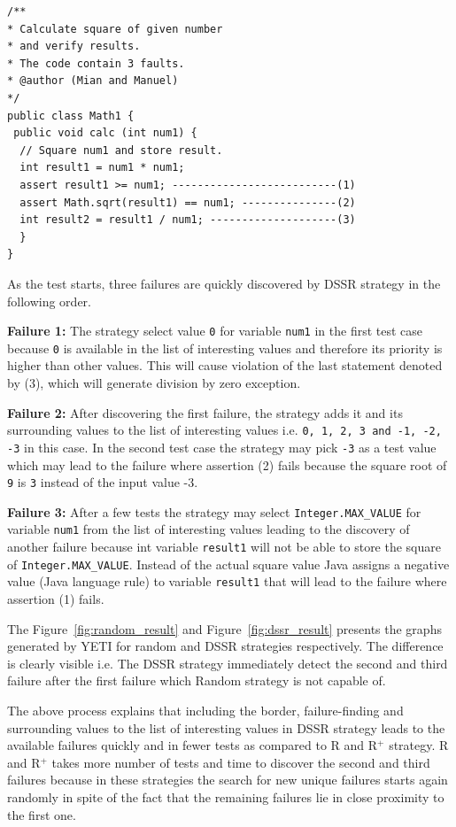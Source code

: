 \bigskip
\begin{lstlisting}
/** 
* Calculate square of given number 
* and verify results. 
* The code contain 3 faults.
* @author (Mian and Manuel)
*/
public class Math1 {
 public void calc (int num1) {
  // Square num1 and store result. 
  int result1 = num1 * num1; 
  assert result1 >= num1; --------------------------(1)
  assert Math.sqrt(result1) == num1; ---------------(2)
  int result2 = result1 / num1; --------------------(3)
  } 
}
\end{lstlisting}

As the test starts, three failures are quickly discovered by DSSR strategy in the following order.

\indent \textbf{Failure 1:} The strategy select value \verb+0+ for variable \verb+num1+  in the first test case because \verb+0+ is available in the list of interesting values and therefore its priority is higher than other values. This will cause violation of the last statement denoted by (3), which will generate division by zero exception.

\indent \textbf{Failure 2:} After discovering the first failure, the strategy adds it and its surrounding values to the list of interesting values i.e. \verb+0, 1, 2, 3 and -1, -2, -3+ in this case. In the second test case the strategy may pick \verb+-3+ as a test value which may lead to the failure where assertion (2) fails because the square root of \verb+9+ is \verb+3+ instead of the input value -3.

\indent \textbf{Failure 3:} After a few tests the strategy may select \verb+Integer.MAX_VALUE+ for variable \verb+num1+  from the list of interesting values leading to the discovery of another failure because int variable \verb+result1+ will not be able to store the square of \verb+Integer.MAX_VALUE+. Instead of the actual square value Java assigns a negative value (Java language rule) to variable \verb+result1+ that will lead to the failure where assertion (1) fails.

The Figure~\ref{fig:random_result} and Figure~\ref{fig:dssr_result} presents the graphs generated by YETI for random and DSSR strategies respectively. The difference is clearly visible i.e. The DSSR strategy immediately detect the second and third failure after the first failure which Random strategy is not capable of. 

The above process explains that including the border, failure-finding and surrounding values to the list of interesting values in DSSR strategy leads to the available failures quickly and in fewer tests as compared to R and R$^+$ strategy. R and R$^+$ takes more number of tests and time to discover the second and third failures because in these strategies the search for new unique failures starts again randomly in spite of the fact that the remaining failures lie in close proximity to the first one.


